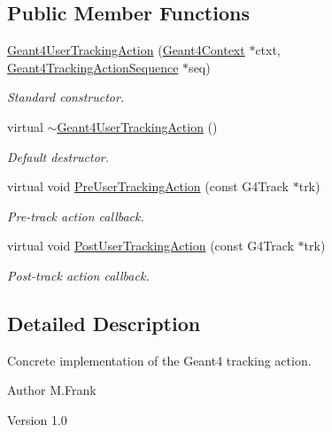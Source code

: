 \subsection*{Public Member Functions}
\begin{DoxyCompactItemize}
\item 
\hyperlink{class_d_d4hep_1_1_simulation_1_1_geant4_user_tracking_action_acee865c27f15ffd9f2d4c386f9ab7e8e}{Geant4UserTrackingAction} (\hyperlink{class_d_d4hep_1_1_simulation_1_1_geant4_context}{Geant4Context} $\ast$ctxt, \hyperlink{class_d_d4hep_1_1_simulation_1_1_geant4_tracking_action_sequence}{Geant4TrackingActionSequence} $\ast$seq)
\begin{DoxyCompactList}\small\item\em Standard constructor. \item\end{DoxyCompactList}\item 
virtual \hyperlink{class_d_d4hep_1_1_simulation_1_1_geant4_user_tracking_action_a2c2e499d1ac638f2519fa8f6f221bdc0}{$\sim$Geant4UserTrackingAction} ()
\begin{DoxyCompactList}\small\item\em Default destructor. \item\end{DoxyCompactList}\item 
virtual void \hyperlink{class_d_d4hep_1_1_simulation_1_1_geant4_user_tracking_action_a3c44bbbed885071eb14c08274e1b32a2}{PreUserTrackingAction} (const G4Track $\ast$trk)
\begin{DoxyCompactList}\small\item\em Pre-\/track action callback. \item\end{DoxyCompactList}\item 
virtual void \hyperlink{class_d_d4hep_1_1_simulation_1_1_geant4_user_tracking_action_ab5aeccf26ec4213e75bbdf6927bc7ee6}{PostUserTrackingAction} (const G4Track $\ast$trk)
\begin{DoxyCompactList}\small\item\em Post-\/track action callback. \item\end{DoxyCompactList}\end{DoxyCompactItemize}


\subsection{Detailed Description}
Concrete implementation of the Geant4 tracking action. \begin{DoxyAuthor}{Author}
M.Frank 
\end{DoxyAuthor}
\begin{DoxyVersion}{Version}
1.0 
\end{DoxyVersion}


